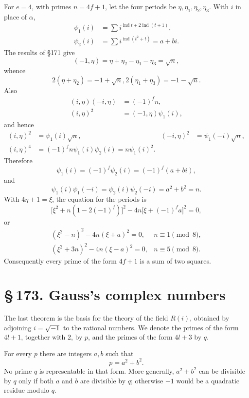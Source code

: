 \documentclass[11pt]{article}
\providecommand{\sect}[2]{\section*{\S\,#1. #2}}
\providecommand{\ind}{\operatorname{ind}}
\begin{document}
For $e=4$, with primes $n=4f+1$, let the four periods be $\eta,
\eta_1,
\eta_2,
\eta_3$. With $i$ in place of $\alpha$,
\[
\begin{aligned}
\psi_1(i)&=\sum i^{\ind t+2\ind(t+1)},\\
\psi_2(i)&=\sum i^{\ind(t^2+t)}=a+bi.
\end{aligned}                                                          \tag{24}
\]
The results of §171 give
\[
        (-1,
\eta)=\eta+
\eta_2-
\eta_1-
\eta_3=\sqrt n,                                      \tag{25}
\]
whence
\[
        2(\eta+
\eta_2)=-1+\sqrt n,
        2(\eta_1+
\eta_3)=-1-
\sqrt n.                           \tag{26}
\]
Also
\[
\begin{aligned}
        (i,
\eta)(-i,
\eta)&=(-1)^f n,\\
        (i,
\eta)^2&=(-1,
\eta)\psi_1(i),
\end{aligned}                                                          \tag{27}
\]
and hence
\[
\begin{aligned}
        (i,
\eta)^2&=\psi_1(i)\sqrt n,
        &(-i,
\eta)^2&=\psi_1(-i)\sqrt n,\\
        (i,
\eta)^4&=(-1)^f n\psi_1(i)\psi_2(i)=n\psi_1(i)^2.
\end{aligned}                                                          \tag{28}
\]
Therefore
\[
        \psi_1(i)=(-1)^f\psi_2(i)=(-1)^f(a+bi),                        \tag{29}
\]
and
\[
        \psi_1(i)\psi_1(-i)=\psi_2(i)\psi_2(-i)=a^2+b^2=n.              \tag{30}
\]
With $4\eta+1=\xi$, the equation for the periods is
\[
        \bigl[\xi^2+n(1-2(-1)^f)\bigr]^2
        -4n\bigl[\xi+(-1)^fa\bigr]^2=0,                                \tag{31}
\]
or
\[
\begin{array}{ll}
        (\xi^2-n)^2-4n(\xi+a)^2=0,
        & n\equiv1\pmod8,\\[0.4em]
        (\xi^2+3n)^2-4n(\xi-a)^2=0,
        & n\equiv5\pmod8.
\end{array}                                                            \tag{32}
\]
Consequently every prime of the form $4f+1$ is a sum of two squares.

\sect{173}{Gauss's complex numbers}

The last theorem is the basis for the theory of the field $R(i)$, obtained by adjoining $i=\sqrt{-1}$ to the rational numbers. We denote the primes of the form $4l+1$, together with $2$, by $p$, and the primes of the form $4l+3$ by $q$.

For every $p$ there are integers $a,b$ such that
\[
        p=a^2+b^2.                                                      \tag{1}
\]
No prime $q$ is representable in that form. More generally, $a^2+b^2$ can be divisible by $q$ only if both $a$ and $b$ are divisible by $q$; otherwise $-1$ would be a quadratic residue modulo $q$.
\end{document}
